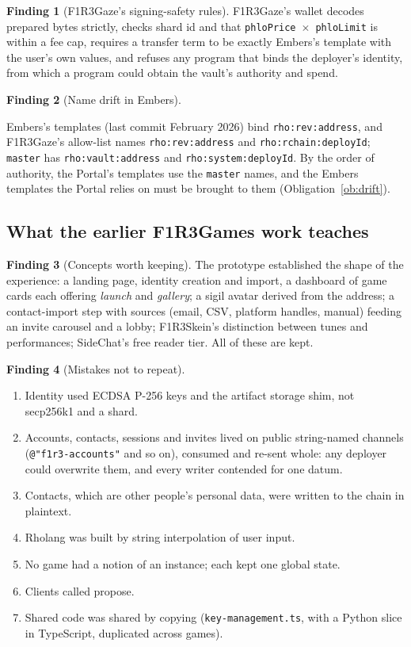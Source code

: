 \documentclass[11pt]{article}
\theoremstyle{definition}
\newtheorem{finding}{Finding}
\theoremstyle{remark}
\newcommand{\code}[1]{\texttt{#1}}
\newcommand{\Em}{Embers}
\newcommand{\Gz}{F1R3Gaze}
\begin{document}
\begin{finding}[\Gz{}'s signing-safety rules]\label{f:gaze}
\Gz{}'s wallet decodes prepared bytes strictly, checks shard id and that
\code{phloPrice}~$\times$~\code{phloLimit} is within a fee cap, requires a transfer
term to be exactly \Em{}'s template with the user's own values, and refuses any
program that binds the deployer's identity, from which a program could obtain the
vault's authority and spend.
\end{finding}

\begin{finding}[Name drift in \Em{}]\label{f:drift}
\raggedright
\Em{}'s templates (last commit February 2026) bind \code{rho:rev:address}, and
\Gz{}'s allow-list names \code{rho:rev:address} and \code{rho:rchain:deployId};
\code{master} has \code{rho:vault:address} and \code{rho:system:deployId}. By the
order of authority, the Portal's templates use the \code{master} names, and the
\Em{} templates the Portal relies on must be brought to them
(Obligation~\ref{ob:drift}).
\end{finding}

\subsection{What the earlier F1R3Games work teaches}

\begin{finding}[Concepts worth keeping]\label{f:keep}
The prototype established the shape of the experience: a landing page, identity
creation and import, a dashboard of game cards each offering \emph{launch} and
\emph{gallery}; a sigil avatar derived from the address; a contact-import step with
sources (email, CSV, platform handles, manual) feeding an invite carousel and a lobby;
F1R3Skein's distinction between tunes and performances; SideChat's free reader tier.
All of these are kept.
\end{finding}

\begin{finding}[Mistakes not to repeat]\label{f:mistakes}
\begin{enumerate}[leftmargin=*,itemsep=1pt]
\item Identity used ECDSA P-256 keys and the artifact storage shim, not secp256k1
  and a shard.
\item Accounts, contacts, sessions and invites lived on public string-named channels
  (\code{@"f1r3-accounts"} and so on), consumed and re-sent whole: any deployer could
  overwrite them, and every writer contended for one datum.
\item Contacts, which are other people's personal data, were written to the chain in
  plaintext.
\item Rholang was built by string interpolation of user input.
\item No game had a notion of an instance; each kept one global state.
\item Clients called propose.
\item Shared code was shared by copying (\code{key-management.ts}, with a Python
  slice in TypeScript, duplicated across games).
\end{enumerate}
\end{finding}
\end{document}
